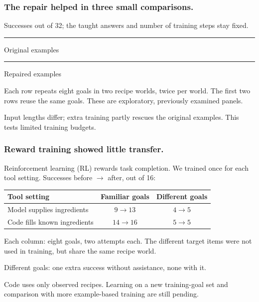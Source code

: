 \documentclass[aspectratio=169,12pt]{beamer}
\newcommand{\aside}[1]{\vfill{\footnotesize\color{Gray}#1\par}}
\begin{document}
\begin{frame}[t]
\frametitle{The repair helped in three small comparisons.}
Successes out of 32; the taught answers and number of training steps stay fixed.
\vspace{1mm}
\begin{center}
\end{center}
{\small\color{Gray}\rule{4mm}{2mm} Original examples\qquad\color{Teal}\rule{4mm}{2mm} Repaired examples}
\medskip

{\small Each row repeats eight goals in two recipe worlds, twice per world. The first two rows reuse the same goals. These are exploratory, previously examined panels.}
\aside{Input lengths differ; extra training partly rescues the original examples. This tests limited training budgets.}
\end{frame}

\begin{frame}[t]
\frametitle{Reward training showed little transfer.}
Reinforcement learning (RL) rewards task completion. We trained once for each tool setting. Successes before $\to$ after, out of 16:
\vspace{3mm}
\begin{center}
\renewcommand{\arraystretch}{1.25}
\begin{tabular}{lcc}
\toprule
Tool setting & Familiar goals & Different goals\\
\midrule
Model supplies ingredients & $9 \to 13$ & $4 \to 5$\\
Code fills known ingredients & $14 \to 16$ & $5 \to 5$\\
\bottomrule
\end{tabular}
\end{center}
\medskip

Each column: eight goals, two attempts each. The different target items were not used in training, but share the same recipe world.
\medskip

Different goals: one extra success without assistance, none with it.
\aside{Code uses only observed recipes. Learning on a new training-goal set and comparison with more example-based training are still pending.}
\end{frame}
\end{document}
